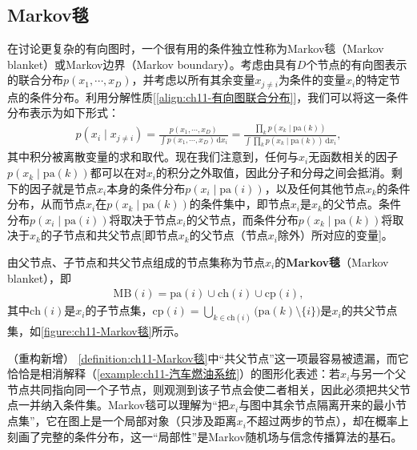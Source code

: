 \documentclass[../../main.tex]{subfiles}
\begin{document}
\subsection{Markov毯}\label{subsection:ch11-Markov毯}

在讨论更复杂的有向图时，一个很有用的条件独立性称为Markov毯（Markov blanket）或Markov边界（Markov boundary）。考虑由具有$D$个节点的有向图表示的联合分布$p(x_1,\cdots,x_D)$，并考虑以所有其余变量$x_{j\neq i}$为条件的变量$x_i$的特定节点的条件分布。利用分解性质[\eqref{align:ch11-有向图联合分布}]，我们可以将这一条件分布表示为如下形式：
\begin{align*}
  p(x_i\mid x_{j\neq i}) = \frac{p(x_1,\cdots,x_D)}{\int p(x_1,\cdots,x_D)\,\mathrm{d}x_i} = \frac{\prod_k p(x_k\mid \mathrm{pa}(k))}{\int\prod_k p(x_k\mid \mathrm{pa}(k))\,\mathrm{d}x_i},
\end{align*}
其中积分被离散变量的求和取代。现在我们注意到，任何与$x_i$无函数相关的因子$p(x_k\mid \mathrm{pa}(k))$都可以在对$x_i$的积分之外取值，因此分子和分母之间会抵消。剩下的因子就是节点$x_i$本身的条件分布$p(x_i\mid \mathrm{pa}(i))$，以及任何其他节点$x_k$的条件分布，从而节点$x_i$在$p(x_k\mid \mathrm{pa}(k))$的条件集中，即节点$x_i$是$x_k$的父节点。条件分布$p(x_i\mid \mathrm{pa}(i))$将取决于节点$x_i$的父节点，而条件分布$p(x_k\mid \mathrm{pa}(k))$将取决于$x_k$的子节点和共父节点[即节点$x_k$的父节点（节点$x_i$除外）所对应的变量]。

\begin{definition}[Markov毯]\label{definition:ch11-Markov毯}
由父节点、子节点和共父节点组成的节点集称为节点$x_i$的\textbf{Markov毯}（Markov blanket），即
\begin{align}
  \mathrm{MB}(i) = \mathrm{pa}(i)\cup \mathrm{ch}(i)\cup \mathrm{cp}(i),
  \label{align:ch11-Markov毯定义}
\end{align}
其中$\mathrm{ch}(i)$是$x_i$的子节点集，$\mathrm{cp}(i)=\bigcup_{k\in\mathrm{ch}(i)}\bigl(\mathrm{pa}(k)\setminus\{i\}\bigr)$是$x_i$的共父节点集，如\cref{figure:ch11-Markov毯}所示。
\end{definition}

\begin{remark}（重构新增）
\cref{definition:ch11-Markov毯}中“共父节点”这一项最容易被遗漏，而它恰恰是相消解释（\cref{example:ch11-汽车燃油系统}）的图形化表述：若$x_i$与另一个父节点共同指向同一个子节点，则观测到该子节点会使二者相关，因此必须把共父节点一并纳入条件集。Markov毯可以理解为“把$x_i$与图中其余节点隔离开来的最小节点集”，它在图上是一个局部对象（只涉及距离$x_i$不超过两步的节点），却在概率上刻画了完整的条件分布，这一“局部性”是Markov随机场与信念传播算法的基石。
\end{remark}
\end{document}
